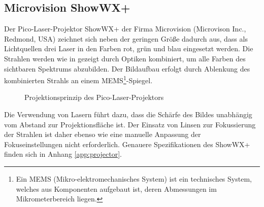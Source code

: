 


\subsection{Microvision ShowWX+\textsuperscript{\texttrademark}}%
\label{chap.projector}
Der Pico-Laser-Projektor ShowWX+\textsuperscript{\texttrademark} der Firma Microvision (Microvison Inc., Redmond, USA) zeichnet sich neben der geringen Größe dadurch aus, dass als Lichtquellen drei Laser in den Farben rot, grün und blau eingesetzt werden. Die Strahlen werden wie in  gezeigt durch Optiken kombiniert, um alle Farben des sichtbaren Spektrums abzubilden. Der Bildaufbau erfolgt durch Ablenkung des kombinierten Strahls an einem MEMS\footnote{Ein MEMS (Mikro-elektromechanisches System) ist ein technisches System, welches aus Komponenten aufgebaut ist, deren Abmessungen im Mikrometerbereich liegen.}-Spiegel.


\begin{figure}[ht]
	\begin{center}
		\caption{Projektionsprinzip des Pico-Laser-Projektors}
		\label{fig.projtech}
	\end{center}
\end{figure}


Die Verwendung von Lasern führt dazu, dass die Schärfe des Bildes unabhängig vom Abstand zur Projektionsfläche ist. Der Einsatz von Linsen zur Fokussierung der Strahlen ist daher ebenso wie eine manuelle Anpassung der Fokuseinstellungen nicht erforderlich. Genauere Spezifikationen des ShowWX+\textsuperscript{\texttrademark} finden sich in Anhang \ref{app:projector}.


